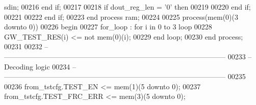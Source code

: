 \begin{DoxyCode}
{      sdin};
00216          \textcolor{keywordflow}{end} \textcolor{keywordflow}{if};
00217          
00218          \textcolor{keywordflow}{if} \textcolor{vhdlchar}{dout_reg_len} \textcolor{vhdlchar}{=} \textcolor{vhdlchar}{'}\textcolor{vhdllogic}{}\textcolor{vhdllogic}{0}\textcolor{vhdlchar}{'} \textcolor{keywordflow}{then}
00219          
00220          \textcolor{keywordflow}{end} \textcolor{keywordflow}{if};
00221             
00222       \textcolor{keywordflow}{end} \textcolor{keywordflow}{if};
00223    \textcolor{keywordflow}{end} \textcolor{keywordflow}{process} \textcolor{vhdlchar}{ram};
00224    
00225    \textcolor{keywordflow}{process}(mem(\textcolor{vhdllogic}{0})(\textcolor{vhdllogic}{3} \textcolor{keywordflow}{downto} \textcolor{vhdllogic}{0}))
00226 \textcolor{vhdlkeyword}{   begin }
00227       \textcolor{vhdlchar}{for\_loop} \textcolor{vhdlchar}{:} \textcolor{keywordflow}{for} \textcolor{vhdlchar}{i} \textcolor{keywordflow}{in} \textcolor{vhdllogic}{}\textcolor{vhdllogic}{0} \textcolor{keywordflow}{to} \textcolor{vhdllogic}{}\textcolor{vhdllogic}{3} \textcolor{keywordflow}{loop}  
00228          \textcolor{vhdlchar}{GW_TEST_RES}\textcolor{vhdlchar}{(}\textcolor{vhdlchar}{i}\textcolor{vhdlchar}{)} \textcolor{vhdlchar}{<=} \textcolor{keywordflow}{not} \textcolor{vhdlchar}{mem}\textcolor{vhdlchar}{(}\textcolor{vhdllogic}{}\textcolor{vhdllogic}{0}\textcolor{vhdlchar}{)}\textcolor{vhdlchar}{(}\textcolor{vhdlchar}{i}\textcolor{vhdlchar}{)};
00229       \textcolor{keywordflow}{end} \textcolor{keywordflow}{loop};
00230    \textcolor{keywordflow}{end} \textcolor{keywordflow}{process};
00231    
00232 \textcolor{keyword}{   -- ---------------------------------------------------------------------------------------------}
00233 \textcolor{keyword}{   -- Decoding logic}
00234 \textcolor{keyword}{   -- ---------------------------------------------------------------------------------------------}
00235    
00236    \textcolor{vhdlchar}{from_tstcfg}\textcolor{vhdlchar}{.}\textcolor{vhdlchar}{TEST_EN}       \textcolor{vhdlchar}{<=} \textcolor{vhdlchar}{mem}\textcolor{vhdlchar}{(}\textcolor{vhdllogic}{}\textcolor{vhdllogic}{1}\textcolor{vhdlchar}{)}\textcolor{vhdlchar}{(}\textcolor{vhdllogic}{}\textcolor{vhdllogic}{5} \textcolor{keywordflow}{downto} \textcolor{vhdllogic}{}\textcolor{vhdllogic}{0}\textcolor{vhdlchar}{)};
00237    \textcolor{vhdlchar}{from_tstcfg}\textcolor{vhdlchar}{.}\textcolor{vhdlchar}{TEST_FRC_ERR}  \textcolor{vhdlchar}{<=} \textcolor{vhdlchar}{mem}\textcolor{vhdlchar}{(}\textcolor{vhdllogic}{}\textcolor{vhdllogic}{3}\textcolor{vhdlchar}{)}\textcolor{vhdlchar}{(}\textcolor{vhdllogic}{}\textcolor{vhdllogic}{5} \textcolor{keywordflow}{downto} \textcolor{vhdllogic}{}\textcolor{vhdllogic}{0}\textcolor{vhdlchar}{)};

\end{DoxyCode}
